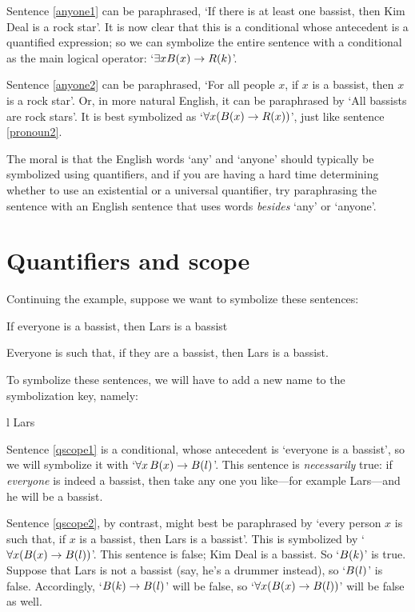 Sentence \ref{anyone1} can be paraphrased, `If there is at least one bassist, then Kim Deal is a rock star'. It is now clear that this is a conditional whose antecedent is a quantified expression; so we can symbolize the entire sentence with a conditional as the main logical operator: `$\exists x \mathord{B}(x) \rightarrow \mathord{R}(k)$'.

Sentence \ref{anyone2} can be paraphrased, `For all people $x$, if $x$ is a bassist, then $x$ is a rock star'. Or, in more natural English, it can be paraphrased by `All bassists are rock stars'. It is best symbolized as `$\forall x(\mathord{B}(x) \rightarrow \mathord{R}(x))$', just like sentence \ref{pronoun2}.

The moral is that the English words `any' and `anyone' should typically be symbolized using quantifiers, and if you are having a hard time determining whether to use an existential or a universal quantifier, try paraphrasing the sentence with an English sentence that uses words \emph{besides} `any' or `anyone'.



\section{Quantifiers and scope}
Continuing the example, suppose we want to symbolize these sentences:
	\begin{earg}
		\item[\ex{qscope1}] If everyone is a bassist, then Lars is a bassist
		\item[\ex{qscope2}] Everyone is such that, if they are a bassist, then Lars is a bassist.
	\end{earg}
To symbolize these sentences, we will have to add a new name to the symbolization key, namely:
	\begin{ekey}
		\item[l] Lars
	\end{ekey}
Sentence \ref{qscope1} is a conditional, whose antecedent is `everyone is a bassist', so we will symbolize it with `$\forall x\, \mathord{B}(x) \rightarrow \mathord{B}(l)$'. This sentence is \emph{necessarily} true: if \emph{everyone} is indeed a bassist, then take any one you like---for example Lars---and he will be a bassist. 

Sentence \ref{qscope2}, by contrast, might best be paraphrased by `every person $x$ is such that, if $x$ is a bassist, then Lars is a bassist'. This is symbolized by `$\forall x (\mathord{B}(x) \rightarrow \mathord{B}(l))$'. This sentence is false; Kim Deal is a bassist. So `$\mathord{B}(k)$' is true. Suppose that Lars is not a bassist (say, he's a drummer instead), so `$\mathord{B}(l)$' is false. Accordingly, `$\mathord{B}(k) \rightarrow \mathord{B}(l)$' will be false, so `$\forall x (\mathord{B}(x) \rightarrow \mathord{B}(l))$' will be false as well. 

